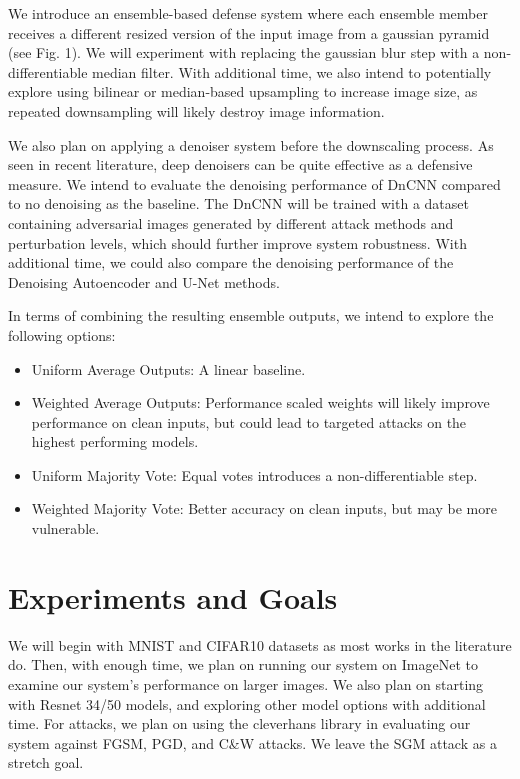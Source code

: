\documentclass[10pt,journal,compsoc]{IEEEtran}
\begin{document}
We introduce an ensemble-based defense system where each ensemble member receives a different resized version of the input image from a gaussian pyramid (see Fig. 1). We will experiment with replacing the gaussian blur step with a non-differentiable median filter. With additional time, we also intend to potentially explore using bilinear or median-based upsampling to increase image size, as repeated downsampling will likely destroy image information. 

We also plan on applying a denoiser system before the downscaling process. As seen in recent literature, deep denoisers can be quite effective as a defensive measure. We intend to evaluate the denoising performance of DnCNN compared to no denoising as the baseline. The DnCNN will be trained with a dataset containing adversarial images generated by different attack methods and perturbation levels, which should further improve system robustness. With additional time, we could also compare the denoising performance of the Denoising Autoencoder and U-Net methods. 

In terms of combining the resulting ensemble outputs, we intend to explore the following options:
\begin{itemize}
\item Uniform Average Outputs: A linear baseline.
\item Weighted Average Outputs: Performance scaled weights will likely improve performance on clean inputs, but could lead to targeted attacks on the highest performing models. 
\item Uniform Majority Vote: Equal votes introduces a non-differentiable step.
\item Weighted Majority Vote: Better accuracy on clean inputs, but may be more vulnerable.
\end{itemize}

\section{Experiments and Goals}
We will begin with MNIST and CIFAR10 datasets as most works in the literature do. Then, with enough time, we plan on running our system on ImageNet to examine our system's performance on larger images. We also plan on starting with Resnet 34/50 models, and exploring other model options with additional time. For attacks, we plan on using the cleverhans library in evaluating our system against FGSM, PGD, and C\&W attacks. We leave the SGM attack as a stretch goal. 
\end{document}
